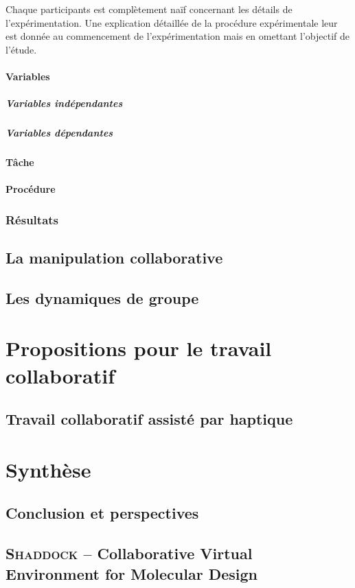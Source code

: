 \documentclass[myfrancais]{mythesis}
\newcommand{\acro}[1]{\textsc{#1}}
\begin{document}
	Chaque participants est complètement naïf concernant les détails de l'expérimentation.
	Une explication détaillée de la procédure expérimentale leur est donnée au commencement de l'expérimentation mais en omettant l'objectif de l'étude.

	\subsection{Variables}
	\subsubsection{Variables indépendantes}
	\subsubsection{Variables dépendantes}
	\subsection{Tâche}
	\subsection{Procédure}
	\section{Résultats}
	\chapter{La manipulation collaborative}
	\chapter{Les dynamiques de groupe}
	\part{Propositions pour le travail collaboratif}
	\chapter{Travail collaboratif assisté par haptique}
	\part{Synthèse}
	\chapter{Conclusion et perspectives}

	\appendix
	\chapter{\acro{Shaddock} -- Collaborative Virtual Environment for Molecular Design}
\end{document}
